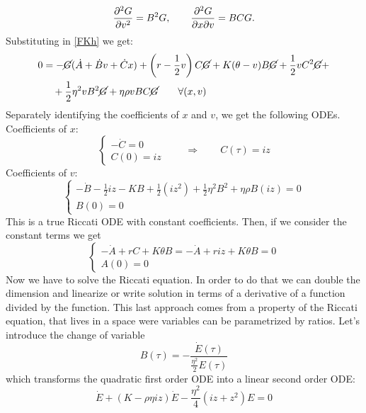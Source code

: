 \begin{align*}
    \pdv[2]{G}{v} = B^2G, \qquad \pdv{G}{x}{v} = BCG.
\end{align*}
Substituting in \eqref{FKh} we get:
\begin{align}
    \notag 0 &= -\cancel{G}(\dot{A}+\dot{B}v+\dot{C}x) + \left(r-\frac{1}{2}v\right)C\cancel{G} + K(\theta-v)B\cancel{G} + \frac{1}{2}vC^2\cancel{G} + \\
    &\quad + \frac{1}{2}\eta^2vB^2\cancel{G} + \eta\rho v BC\cancel{G} \qquad \forall(x,v)
\end{align}
Separately identifying the coefficients of $x$ and $v$, we get the following ODEs. Coefficients of $x$:
\begin{equation*}
    \begin{cases}
    -\dot{C} = 0 \\
    C(0) = iz
    \end{cases} \qquad \Rightarrow \qquad C(\tau) = iz
\end{equation*}
Coefficients of $v$:
\begin{equation*}
    \begin{cases}
    -\dot{B} -\frac{1}{2}iz - KB + \frac{1}{2}(iz^2) + \frac{1}{2}\eta^2B^2 + \eta\rho B(iz) = 0 \\
    B(0) = 0
    \end{cases}
\end{equation*}
This is a true Riccati ODE with constant coefficients. Then, if we consider the constant terms we get
\begin{equation*}
    \begin{cases}
    -\dot{A} + rC + K\theta B = -\dot{A} + riz + K\theta B = 0 \\
    A(0) = 0
    \end{cases}
\end{equation*}
Now we have to solve the Riccati equation. In order to do that we can double the dimension and linearize or write solution in terms of a derivative of a function divided by the function. This last approach comes from a property of the Riccati equation, that lives in a space were variables can be parametrized by ratios. Let's introduce the change of variable
\begin{equation}
    B(\tau) = - \frac{\dot{E}(\tau)}{\tfrac{\eta^2}{2}E(\tau)}
\end{equation}
which transforms the quadratic first order ODE into a linear second order ODE:
\begin{equation*}
    \dot{E} + (K-\rho\eta iz)\dot{E} - \frac{\eta^2}{4}(iz+z^2)E = 0
\end{equation*}
